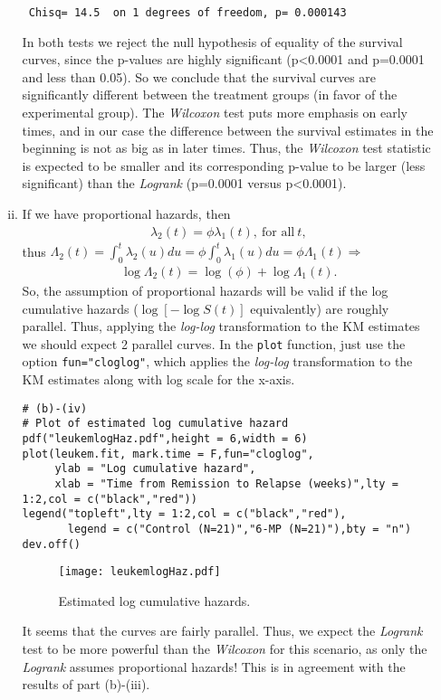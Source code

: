 \begin{enumerate}[(a)]
\begin{enumerate}[(i)]
\begin{footnotesize}
\begin{verbatim}
 Chisq= 14.5  on 1 degrees of freedom, p= 0.000143 
\end{verbatim}
\end{footnotesize}
In both tests we reject the null hypothesis of equality of the survival curves,
since the p-values are highly significant (p<0.0001  and p=0.0001 and less than
0.05). So we conclude that the survival curves are significantly different
between the treatment groups (in favor of the experimental group). The \emph{Wilcoxon}
test puts more emphasis on early times, and in our case the difference between the
survival estimates in the beginning is not as big as in later times. Thus, the \emph{Wilcoxon}
test statistic is expected to be smaller and its corresponding p-value to be larger (less
significant) than the \emph{Logrank} (p=0.0001 versus p<0.0001). 
\item If we have proportional hazards, then
\begin{align}
\lambda_{2}(t) = \phi\lambda_{1}(t), \ \text{for all}\ t,\nonumber
\end{align}
thus $\Lambda_{2}(t)=\int_{0}^{t}\lambda_{2}(u)du
=\phi\int_{0}^{t}\lambda_{1}(u)du=\phi\Lambda_{1}(t) \Rightarrow$
\begin{align}
\log\Lambda_{2}(t) = \log(\phi) + \log\Lambda_{1}(t).\nonumber
\end{align}
So, the assumption of proportional hazards will be valid if the log cumulative hazards ($\log[-\log S(t)]$ equivalently) are roughly parallel. Thus, applying the \emph{log-log} transformation to the KM estimates we should expect 2 parallel curves. In the \verb|plot| function, just use the option \verb|fun="cloglog"|, which applies the  \emph{log-log} transformation to the KM estimates along with log scale for the x-axis. 
\begin{footnotesize}
\begin{verbatim}
# (b)-(iv)
# Plot of estimated log cumulative hazard
pdf("leukemlogHaz.pdf",height = 6,width = 6)
plot(leukem.fit, mark.time = F,fun="cloglog",
     ylab = "Log cumulative hazard",
     xlab = "Time from Remission to Relapse (weeks)",lty = 1:2,col = c("black","red"))
legend("topleft",lty = 1:2,col = c("black","red"),
       legend = c("Control (N=21)","6-MP (N=21)"),bty = "n")
dev.off()
\end{verbatim}
\end{footnotesize} 
\begin{figure}[htbp]
	\centering
		\texttt{[image: leukemlogHaz.pdf]}
	\caption{Estimated log cumulative hazards.}
	\label{figure2}
\end{figure}
It seems that the curves are fairly parallel. Thus, we expect the \emph{Logrank} test to be more powerful than the \emph{Wilcoxon} for this scenario, as only the \emph{Logrank} assumes proportional hazards! This is in agreement with the results of part (b)-(iii).
\end{enumerate}
\end{enumerate}
